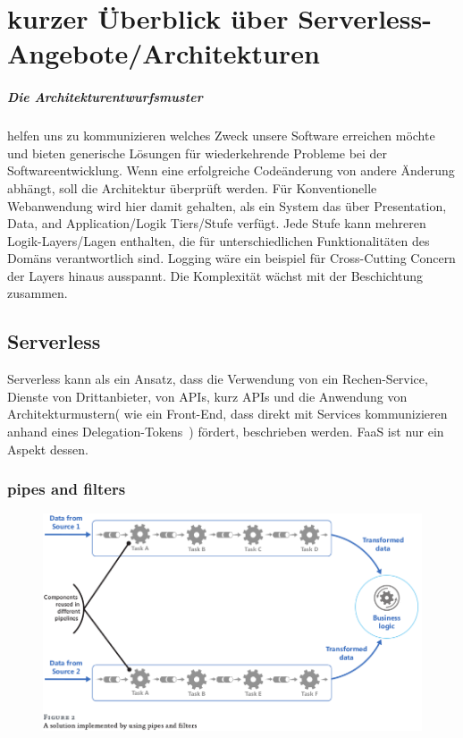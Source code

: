 \documentclass[
12pt,
english,
ngerman,
headsepline,
twoside,
openright,
numbers=noenddot,version=first
]{scrreprt}
\begin{document}
\chapter{kurzer Überblick über Serverless-Angebote/Architekturen}

\paragraph{Die Architekturentwurfsmuster} helfen uns zu kommunizieren welches Zweck unsere Software erreichen möchte und bieten generische Lösungen für wiederkehrende Probleme bei der Softwareentwicklung.
Wenn eine erfolgreiche Codeänderung von andere Änderung abhängt, soll die Architektur überprüft werden.
Für Konventionelle Webanwendung wird hier damit gehalten, als ein System das über Presentation, Data, and Application/Logik Tiers/Stufe verfügt. Jede Stufe kann mehreren Logik-Layers/Lagen enthalten, die für unterschiedlichen Funktionalitäten des Domäns verantwortlich sind. Logging wäre ein beispiel für Cross-Cutting Concern der Layers hinaus ausspannt. Die Komplexität wächst mit der Beschichtung zusammen.\\


\section{Serverless}
\label{sec:serverless}

Serverless kann als ein Ansatz, dass  die Verwendung von ein Rechen-Service, Dienste von Drittanbieter, von \acrfull{API}s, kurz \acrshort{API}s und die Anwendung von Architekturmustern( wie ein Front-End, dass direkt mit Services kommunizieren anhand eines \glqq Delegation-Tokens\grqq\ ) fördert, beschrieben werden. \acrshort{FaaS} ist nur ein Aspekt dessen.

\subsection{pipes and filters}
\begin{figure}[H]
	\includegraphics[scale=0.36]{./pics/arch-pipes-filters-sol.png}
\end{figure}
\end{document}
